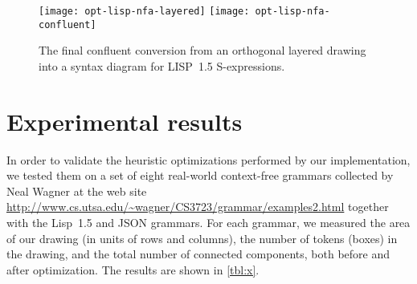\documentclass[10pt]{llncs}
\begin{document}
\begin{figure}
\centering
\texttt{[image: opt-lisp-nfa-layered]}
\hfill
\texttt{[image: opt-lisp-nfa-confluent]}
\caption{The final confluent conversion from an orthogonal layered drawing into a syntax diagram for LISP~1.5 S-expressions.}
\label{fig:confluent-conversion}
\end{figure}

\section{Experimental results}

In order to validate the heuristic optimizations performed by our implementation, we tested them on a set of eight real-world context-free grammars collected by Neal Wagner at the web site \url{http://www.cs.utsa.edu/~wagner/CS3723/grammar/examples2.html} together with the Lisp~1.5 and JSON grammars. For each grammar, we measured the area of our drawing (in units of rows and columns), the number of tokens (boxes) in the drawing, and the total number of connected components, both before and after optimization. The results are shown in \autoref{tbl:x}.
\end{document}
